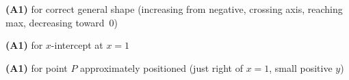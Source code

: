 \documentclass[12pt, twoside]{article}
\begin{document}
\begin{enumerate}[itemsep=0.3cm]
\textbf{(A1)} for correct general shape (increasing from negative,
crossing axis, reaching max, decreasing toward~$0$)

\textbf{(A1)} for $x$-intercept at $x = 1$

\textbf{(A1)} for point $P$ approximately positioned
(just right of $x = 1$, small positive $y$)

\end{enumerate}
\end{document}
